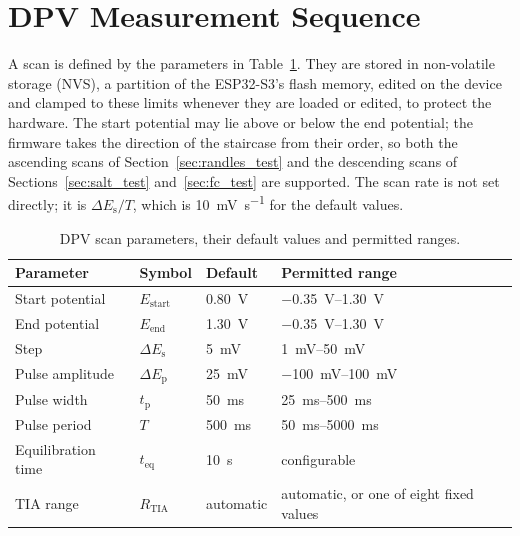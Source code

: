 \section{DPV Measurement Sequence}
\label{sec:sw_dpv}

A scan is defined by the parameters in Table~\ref{tab:sw_params}. They are
stored in non-volatile storage (NVS), a partition of the ESP32-S3's flash memory, edited on the device and clamped to these limits whenever they are loaded or edited, to protect the hardware. The start potential may lie above or below the end potential; the firmware takes the direction of the staircase from their order, so both the ascending scans of Section~\ref{sec:randles_test} and the descending scans of Sections~\ref{sec:salt_test} and~\ref{sec:fc_test} are supported. The scan rate is not set directly; it is $\Delta E_\text{s}/T$, which is \SI{10}{\milli\volt\per\second} for the default values.

\begin{table}[tbp]
  \centering
  \small
  \caption{DPV scan parameters, their default values and permitted ranges.}
  \label{tab:sw_params}
  \begin{tabular}{@{}llll@{}}
    \toprule
    \textbf{Parameter} & \textbf{Symbol} & \textbf{Default} & \textbf{Permitted range} \\
    \midrule
    Start potential   & $E_\text{start}$    & \SI{0.80}{\volt}        & \SIrange{-0.35}{1.30}{\volt} \\
    End potential     & $E_\text{end}$      & \SI{1.30}{\volt}        & \SIrange{-0.35}{1.30}{\volt} \\
    Step              & $\Delta E_\text{s}$ & \SI{5}{\milli\volt}     & \SIrange{1}{50}{\milli\volt} \\
    Pulse amplitude   & $\Delta E_\text{p}$ & \SI{25}{\milli\volt}    & \SIrange{-100}{100}{\milli\volt} \\
    Pulse width       & $t_\text{p}$        & \SI{50}{\milli\second}  & \SIrange{25}{500}{\milli\second} \\
    Pulse period      & $T$                 & \SI{500}{\milli\second} & \SIrange{50}{5000}{\milli\second} \\
    Equilibration time & $t_\text{eq}$      & \SI{10}{\second}        & configurable \\
    TIA range         & $R_\text{TIA}$      & automatic               & automatic, or one of eight fixed values \\
    \bottomrule
  \end{tabular}
\end{table}

